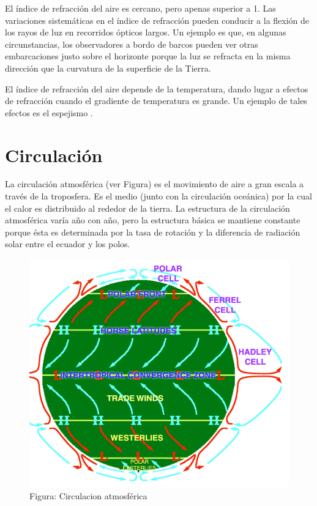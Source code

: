 \documentclass[12pt]{article}
\begin{document}
El índice de refracción del aire es cercano, pero apenas superior a 1. Las variaciones sistemáticas en el índice de refracción pueden conducir a la flexión de los rayos de luz en recorridos ópticos largos. Un ejemplo es que, en algunas circunstancias, los observadores a bordo de barcos pueden ver otras embarcaciones justo sobre el horizonte porque la luz se refracta en la misma dirección que la curvatura de la superficie de la Tierra.

El índice de refracción del aire depende de la temperatura, dando lugar a efectos de refracción cuando el gradiente de temperatura es grande. Un ejemplo de tales efectos es el espejismo .

\section{Circulación}

La circulación atmosférica (ver Figura) es el movimiento de aire a gran escala a través de la troposfera. Es el medio (junto con la circulación oceánica) por la cual el calor es distribuido al rededor de la tierra. La estructura de la circulación atmosférica varía año con año, pero la estructura básica se mantiene constante porque ésta es determinada por la tasa de rotación y la diferencia de radiación solar entre el ecuador y los polos.

\begin{figure}
\begin{centering}
  \includegraphics[scale = 0.5]{Circulacion.png}
  \caption{Figura: Circulacion atmosférica}
\end{centering}
\end{figure}
\end{document}
